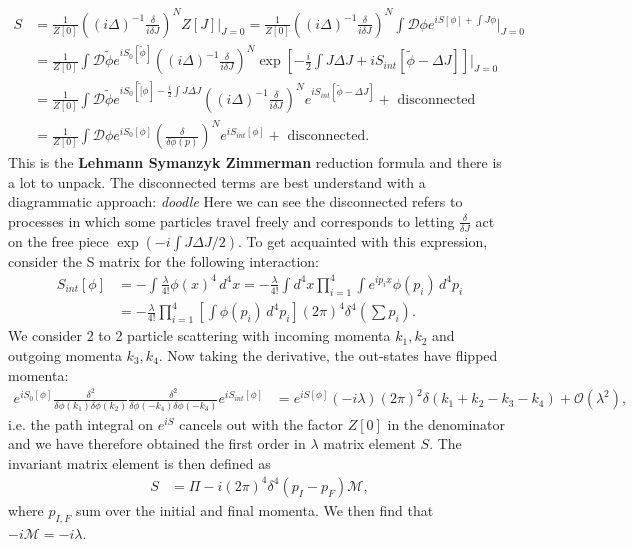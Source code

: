 \documentclass[relqm.tex]{subfiles}
\begin{document}
\begin{align}
    S &= \frac{1}{Z[0]}\left((i\Delta)^{-1}\frac{\delta}{i\delta J}\right)^NZ[J]\bigg|_{J=0} = \frac{1}{Z[0]}\left((i\Delta)^{-1}\frac{\delta}{i\delta J}\right)^N \int \mathcal{D}\phi e^{iS[\phi]+\int J\phi}\bigg|_{J=0} \\
      &= \frac{1}{Z[0]}\int \mathcal{D}\tilde{\phi}e^{iS_0[\tilde{\phi}]}\left((i\Delta)^{-1}\frac{\delta}{i\delta J}\right)^N \exp\left[-\frac{i}{2}\int J\Delta J + iS_{int}[\tilde{\phi}-\Delta J]\right]\bigg|_{J=0} \\
      &= \frac{1}{Z[0]}\int \mathcal{D}\tilde{\phi}e^{iS_0[\tilde[\phi]-\frac{i}{2}\int J\Delta J} \left((i\Delta)^{-1}\frac{\delta}{i\delta J}\right)^N e^{iS_{int}[\tilde{\phi}-\Delta J]}+\text{ disconnected} \\
      &= \frac{1}{Z[0]}\int \mathcal{D}\phi e^{iS_0[\phi]}\left(\frac{\delta}{\delta\phi(p)}\right)^Ne^{iS_{int}[\phi]}+\text{ disconnected}.
\end{align}
This is the \textbf{Lehmann Symanzyk Zimmerman} reduction formula and there is a lot to unpack. 
The disconnected terms are best understand with a diagrammatic approach:
\emph{doodle}
Here we can see the disconnected refers to processes in which some particles travel freely and corresponds to letting $\frac{\delta}{\delta J}$ act on the free piece $\exp\left(-i\int J\Delta J/2\right)$.
To get acquainted with this expression, consider the S matrix for the following interaction:
\begin{align}
    S_{int}[\phi] &= -\int \frac{\lambda}{4!}\phi(x)^4\,d^4x = -\frac{\lambda}{4!}\int d^4x \prod_{i=1}^4 \int e^{ip_ix}\phi(p_i)\,d^4p_i \\
                  &= -\frac{\lambda}{4!}\prod_{i=1}^4 \left[\int \phi(p_i)\,d^4p_i\right](2\pi)^4\delta^4\left(\sum p_i\right).
\end{align}
We consider 2 to 2 particle scattering with incoming momenta $k_1,k_2$ and outgoing momenta $k_3,k_4$.
Now taking the derivative, the out-states have flipped momenta:
\begin{align}
    e^{iS_0[\phi]}\frac{\delta^2}{\delta\phi(k_1)\delta\phi(k_2)}\frac{\delta^2}{\delta\phi(-k_4)\delta\phi(-k_3)}e^{iS_{int}[\phi]} &= e^{iS[\phi]}(-i\lambda)(2\pi)^2\delta(k_1+k_2-k_3-k_4)+\mathcal{O}(\lambda^2),
\end{align}
i.e. the path integral on $e^{iS}$ cancels out with the factor $Z[0]$ in the denominator and we have therefore obtained the first order in $\lambda$ matrix element $S$.
The invariant matrix element is then defined as
\begin{align}
    S &= \Pi - i(2\pi)^4\delta^4(p_I-p_F)\mathcal{M},
\end{align}
where $p_{I,F}$ sum over the initial and final momenta. 
We then find that $-i\mathcal{M}=-i\lambda$.
\end{document}
